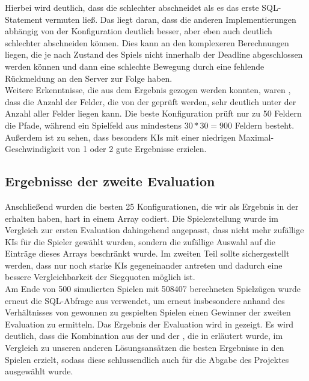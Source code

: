 Hierbei wird deutlich, dass die  schlechter abschneidet als es das erste SQL-Statement vermuten ließ.
Das liegt daran, dass die anderen Implementierungen abhängig von der Konfiguration deutlich besser, aber eben auch
deutlich schlechter abschneiden können.
Dies kann an den komplexeren Berechnungen liegen, die je nach Zustand des Spiels nicht innerhalb der Deadline
abgeschlossen werden können und dann eine schlechte Bewegung durch eine fehlende Rückmeldung an den Server zur Folge
haben. \\

Weitere Erkenntnisse, die aus dem Ergebnis gezogen werden konnten, waren \ua, dass die Anzahl der Felder, die von der
 geprüft werden, sehr deutlich unter der Anzahl aller Felder liegen kann.
Die beste Konfiguration prüft nur zu 50 Feldern die Pfade, während ein Spielfeld aus mindestens $30 * 30 = 900$ Feldern
besteht.
Außerdem ist zu sehen, dass besonders \ac{KI}s mit einer niedrigen Maximal-Geschwindigkeit von 1 oder 2 gute Ergebnisse
erzielen.

\subsection{Ergebnisse der zweite Evaluation}
\label{subsec:zweite-evaluation}

Anschließend wurden die besten 25 Konfigurationen, die wir als Ergebnis in der 
erhalten haben, hart in einem Array codiert.
Die Spielerstellung wurde im Vergleich zur ersten Evaluation dahingehend angepasst, dass nicht mehr zufällige \ac{KI}s
für die Spieler gewählt wurden, sondern die zufällige Auswahl auf die Einträge dieses Arrays beschränkt wurde.
Im zweiten Teil sollte sichergestellt werden, dass nur noch starke \ac{KI}s gegeneinander antreten und dadurch eine
bessere Vergleichbarkeit der Siegquoten möglich ist. \\

Am Ende von 500 simulierten Spielen mit 508407 berechneten Spielzügen wurde erneut die SQL-Abfrage aus
 verwendet, um erneut insbesondere anhand des Verhältnisses von gewonnen zu gespielten Spielen
einen Gewinner der zweiten Evaluation zu ermitteln.
Das Ergebnis der Evaluation wird in  gezeigt.
Es wird deutlich, dass die Kombination aus der  und der , die in
 erläutert wurde, im Vergleich zu unseren anderen Lösungsansätzen die besten
Ergebnisse in den Spielen erzielt, sodass diese schlussendlich auch für die Abgabe des Projektes ausgewählt wurde.

